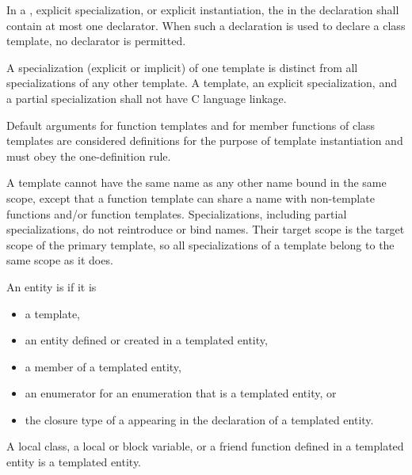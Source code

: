\pnum
In a
,
explicit specialization, or explicit instantiation, the
in the declaration shall contain at most one declarator.
When such a declaration is used to declare a class template,
no declarator is permitted.

\pnum
{}%
A specialization (explicit or implicit) of one template is
distinct from all specializations of any other template.
A template, an explicit specialization, and a
partial specialization shall not have C language linkage.
\begin{note}
Default arguments for function templates and for member functions of
class templates are considered definitions for the purpose of template
instantiation and must obey the one-definition rule.
\end{note}

\pnum
\begin{note}
A template cannot have the same name as any other
name bound in the same scope, except
that a function template can share a name with non-template
functions and/or function templates.
Specializations, including partial specializations,
do not reintroduce or bind names.
Their target scope is the target scope of the primary template,
so all specializations of a template belong to the same scope as it does.
\end{note}

\pnum
{}%
An entity is 
if it is
\begin{itemize}
\item a template,
\item an entity defined or created
      in a templated entity,
\item a member of a templated entity,
\item an enumerator for an enumeration that is a templated entity, or
\item the closure type of a 
      appearing in the declaration of a templated entity.
\end{itemize}

\begin{note}
A local class, a local or block variable, or a friend function defined in a
templated entity is a templated entity.
\end{note}

